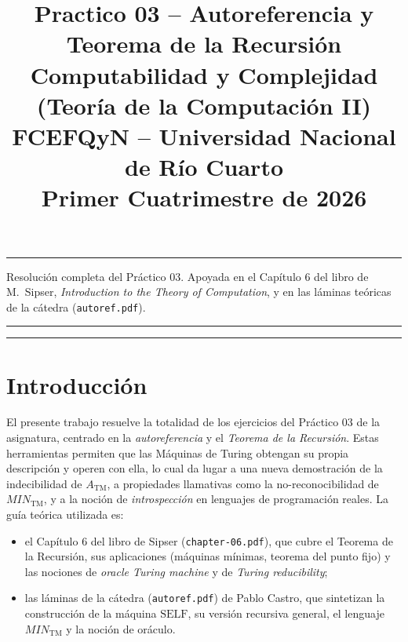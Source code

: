 \documentclass[11pt,a4paper]{article}
\title{\textbf{Practico 03 -- Autoreferencia y Teorema de la Recursi\'on}\\[0.3em]
       \normalsize Computabilidad y Complejidad (Teor\'ia de la Computaci\'on II)\\
       \normalsize FCEFQyN -- Universidad Nacional de R\'io Cuarto\\
       \normalsize Primer Cuatrimestre de 2026}
\author{}
\date{}
\theoremstyle{plain}
\theoremstyle{definition}
\theoremstyle{remark}
\newcommand{\TM}{\mathrm{TM}}
\newcommand{\ATM}{A_{\TM}}
\newcommand{\MIN}{\mathit{MIN}_{\TM}}
\newcommand{\SELF}{\mathrm{SELF}}
\begin{document}
\maketitle
\thispagestyle{empty}

\hrule
\vspace{0.4em}
\begin{center}
\small
Resoluci\'on completa del Pr\'actico 03. Apoyada en el Cap\'itulo 6 del libro
de M.~Sipser, \emph{Introduction to the Theory of Computation}, y en las l\'aminas
te\'oricas de la c\'atedra (\texttt{autoref.pdf}).
\end{center}
\vspace{0.4em}
\hrule

\tableofcontents
\bigskip
\hrule
\bigskip

\section*{Introducci\'on}

El presente trabajo resuelve la totalidad de los ejercicios del Pr\'actico 03
de la asignatura, centrado en la \emph{autoreferencia} y el \emph{Teorema de la
Recursi\'on}. Estas herramientas permiten que las M\'aquinas de Turing obtengan
su propia descripci\'on y operen con ella, lo cual da lugar a una nueva
demostraci\'on de la indecibilidad de $\ATM$, a propiedades llamativas como
la no-reconocibilidad de $\MIN$, y a la noci\'on de \emph{introspecci\'on}
en lenguajes de programaci\'on reales. La gu\'ia te\'orica utilizada es:

\begin{itemize}
  \item el Cap\'itulo 6 del libro de Sipser (\texttt{chapter-06.pdf}), que
        cubre el Teorema de la Recursi\'on, sus aplicaciones (m\'aquinas
        m\'inimas, teorema del punto fijo) y las nociones de \emph{oracle
        Turing machine} y de \emph{Turing reducibility};
  \item las l\'aminas de la c\'atedra (\texttt{autoref.pdf}) de Pablo Castro,
        que sintetizan la construcci\'on de la m\'aquina $\SELF$, su versi\'on
        recursiva general, el lenguaje $\MIN$ y la noci\'on de or\'aculo.
\end{itemize}
\end{document}
